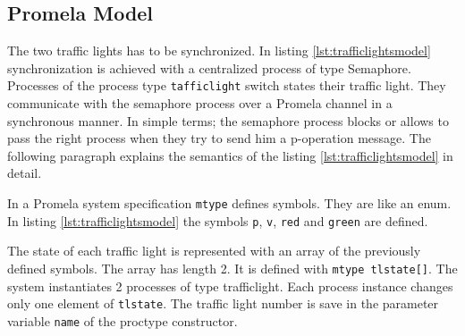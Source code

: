 \documentclass[a4paper, twoside]{article}
\begin{document}
\subsection{Promela Model}
\label{sec:trafficlightsmodel}



The two traffic lights has to be synchronized. In listing \ref{lst:trafficlightsmodel} synchronization is achieved with a centralized process of type Semaphore. Processes of the process type \texttt{tafficlight} switch states their traffic light. They communicate with the semaphore process over a Promela channel in a synchronous manner. In simple terms; the semaphore process blocks or allows to pass the right process when they try to send him a p-operation message. The following paragraph explains the semantics of the listing \ref{lst:trafficlightsmodel} in detail. 

In a Promela system specification \texttt{mtype} defines symbols. They are like an enum. In listing \ref{lst:trafficlightsmodel} the symbols \texttt{p}, \texttt{v}, \texttt{red} and \texttt{green} are defined.

The state of each traffic light is represented with an array of the previously defined symbols. The array has length 2. It is defined with \texttt{mtype tlstate[]}. The system instantiates 2 processes of type trafficlight. Each process instance changes only one element of \texttt{tlstate}. The traffic light number is save in the parameter variable \texttt{name} of the proctype constructor. 
\end{document}
